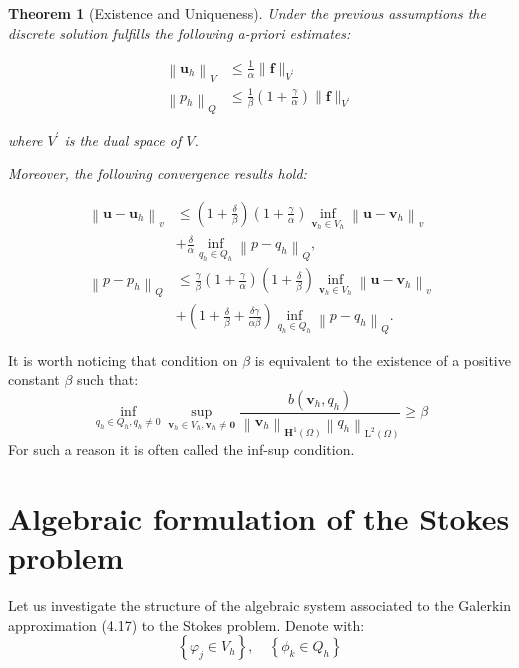 \documentclass[11pt]{book}
\newtheorem{theorem}{Theorem}
\begin{document}
\begin{theorem}[Existence and Uniqueness]
Under the previous assumptions the discrete solution fulfills the following a-priori estimates:

$$
\begin{aligned}
\left\|\mathbf{u}_{h}\right\|_{V} & \leq \frac{1}{\alpha}\|\mathbf{f}\|_{V^{\prime}} \\
\left\|p_{h}\right\|_{Q} & \leq \frac{1}{\beta}\left(1+\frac{\gamma}{\alpha}\right)\|\mathbf{f}\|_{V^{\prime}}
\end{aligned}
$$

where $V^{\prime}$ is the dual space of $V$.

Moreover, the following convergence results hold:

$$
\begin{aligned}
\left\|\mathbf{u}-\mathbf{u}_{h}\right\|_{v} & \leq\left(1+\frac{\delta}{\beta}\right)\left(1+\frac{\gamma}{\alpha}\right) \inf _{\mathbf{v}_{h} \in V_{h}}\left\|\mathbf{u}-\mathbf{v}_{h}\right\|_{v} \\
& +\frac{\delta}{\alpha} \inf _{q_{h} \in Q_{h}}\left\|p-q_{h}\right\|_{Q}, \\
\left\|p-p_{h}\right\|_{Q} & \leq \frac{\gamma}{\beta}\left(1+\frac{\gamma}{\alpha}\right)\left(1+\frac{\delta}{\beta}\right) \inf _{\mathbf{v}_{h} \in V_{h}}\left\|\mathbf{u}-\mathbf{v}_{h}\right\|_{v} \\
& +\left(1+\frac{\delta}{\beta}+\frac{\delta \gamma}{\alpha \beta}\right) \inf _{q_{h} \in Q_{h}}\left\|p-q_{h}\right\|_{Q} .
\end{aligned}
$$

\end{theorem}
It is worth noticing that condition on $\beta$ is equivalent to the existence of a positive constant $\beta$ such that:
$$
\inf _{q_{h} \in Q_{h}, q_{h} \neq 0} \sup _{\mathbf{v}_{h} \in V_{h}, \mathbf{v}_{h} \neq \mathbf{0}} \frac{b\left(\mathbf{v}_{h}, q_{h}\right)}{\left\|\mathbf{v}_{h}\right\|_{\mathbf{H}^{1}(\Omega)}\left\|q_{h}\right\|_{\mathrm{L}^{2}(\Omega)}} \geq \beta
$$
For such a reason it is often called the inf-sup condition.

\section{Algebraic formulation of the Stokes problem}
Let us investigate the structure of the algebraic system associated to the Galerkin approximation (4.17) to the Stokes problem. Denote with:
$$
\left\{\varphi_{j} \in V_{h}\right\}, \quad\left\{\phi_{k} \in Q_{h}\right\}
$$
\end{document}
